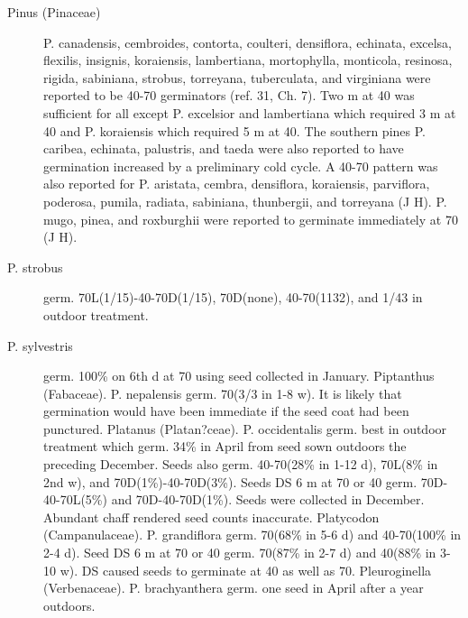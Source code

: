 \begin{description}
\item[Pinus (Pinaceae)] P. canadensis, cembroides, contorta, coulteri, densiflora,
echinata, excelsa, flexilis, insignis, koraiensis, lambertiana, mortophylla, monticola,
resinosa, rigida, sabiniana, strobus, torreyana, tuberculata, and virginiana were
reported to be 40-70 germinators (ref. 31, Ch. 7). Two m at 40 was sufficient for all
except P. excelsior and lambertiana which required 3 m at 40 and P. koraiensis which
required 5 m at 40. The southern pines P. caribea, echinata, palustris, and taeda were
also reported to have germination increased by a preliminary cold cycle. A 40-70
pattern was also reported for P. aristata, cembra, densiflora, koraiensis, parviflora,
poderosa, pumila, radiata, sabiniana, thunbergii, and torreyana (J H). P. mugo, pinea,
and roxburghii were reported to germinate immediately at 70 (J H).
\item[P. strobus] germ. 70L(1/15)-40-70D(1/15), 70D(none), 40-70(1132), and 1/43 in
outdoor treatment.
\item[P. sylvestris] germ. 100\% on 6th d at 70 using seed collected in January.
Piptanthus (Fabaceae). P. nepalensis germ. 70(3/3 in 1-8 w). It is likely
that germination would have been immediate if the seed coat had been punctured.
Platanus (Platan?ceae). P. occidentalis germ. best in outdoor treatment
which germ. 34\% in April from seed sown outdoors the preceding December. Seeds
also germ. 40-70(28\% in 1-12 d), 70L(8\% in 2nd w), and 70D(1\%)-40-70D(3\%).
Seeds DS 6 m at 70 or 40 germ. 70D-40-70L(5\%) and 70D-40-70D(1\%). Seeds were
collected in December. Abundant chaff rendered seed counts inaccurate.
Platycodon (Campanulaceae). P. grandiflora germ. 70(68\% in 5-6 d) and
40-70(100\% in 2-4 d). Seed DS 6 m at 70 or 40 germ. 70(87\% in 2-7 d) and 40(88\%
in 3-10 w). DS caused seeds to germinate at 40 as well as 70.
Pleuroginella (Verbenaceae). P. brachyanthera germ. one seed in April
after a year outdoors.


\end{description}
